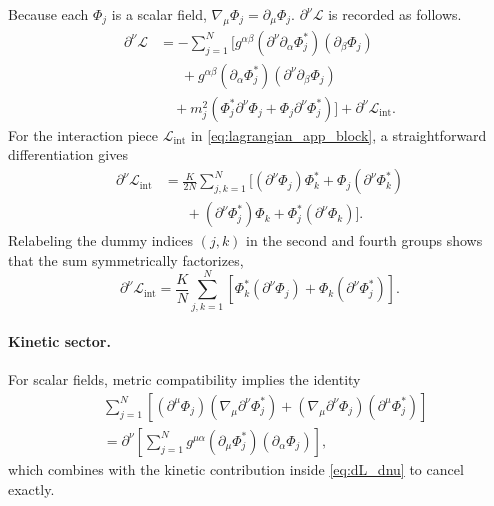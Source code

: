 Because each $\Phi_j$ is a scalar field, $\nabla_\mu\Phi_j=\partial_\mu\Phi_j$.
$\partial^\nu\mathcal{L}$ is recorded as follows.
\begin{align}
\partial^\nu\mathcal{L}
&=-\sum_{j=1}^N\Big[g^{\alpha\beta}(\partial^\nu\partial_\alpha\Phi_j^*)(\partial_\beta\Phi_j) \nonumber\\
&\quad\;\;+g^{\alpha\beta}(\partial_\alpha\Phi_j^*)(\partial^\nu\partial_\beta\Phi_j) \nonumber\\
&\quad+m_j^2\left(\Phi_j^*\partial^\nu\Phi_j+\Phi_j\partial^\nu\Phi_j^*\right)\Big]
+\partial^\nu\mathcal{L}_{\mathrm{int}} .
\label{eq:dL_dnu}
\end{align}
For the interaction piece $\mathcal{L}_{\mathrm{int}}$ in \eqref{eq:lagrangian_app_block}, a straightforward differentiation gives
\begin{equation}
\begin{aligned}
\partial^\nu\mathcal{L}_{\mathrm{int}}
&=\frac{K}{2N}\sum_{j,k=1}^N\Big[(\partial^\nu\Phi_j)\Phi_k^*+\Phi_j(\partial^\nu\Phi_k^*) \\
&\quad\;\;+(\partial^\nu\Phi_j^*)\Phi_k+\Phi_j^*(\partial^\nu\Phi_k)\Big] .
\end{aligned}
\label{eq:dLint_dnu}
\end{equation}
Relabeling the dummy indices $(j,k)$ in the second and fourth groups shows that the sum symmetrically factorizes,
\begin{equation}
\partial^\nu\mathcal{L}_{\mathrm{int}}
=\frac{K}{N}\sum_{j,k=1}^N\left[\Phi_k^*(\partial^\nu\Phi_j)+\Phi_k(\partial^\nu\Phi_j^*)\right] .
\label{eq:dLint_dnu_sym}
\end{equation}

\paragraph{Kinetic sector.}
For scalar fields, metric compatibility implies the identity
\begin{equation}
\begin{aligned}
&\sum_{j=1}^N\left[(\partial^\mu\Phi_j)(\nabla_\mu\partial^\nu\Phi_j^*)
+(\nabla_\mu\partial^\nu\Phi_j)(\partial^\mu\Phi_j^*)\right] \\
&=\partial^\nu\left[\sum_{j=1}^Ng^{\mu\alpha}(\partial_\mu\Phi_j^*)(\partial_\alpha\Phi_j)\right] ,
\end{aligned}
\label{eq:kinetic_identity}
\end{equation}
which combines with the kinetic contribution inside \eqref{eq:dL_dnu} to cancel exactly.

